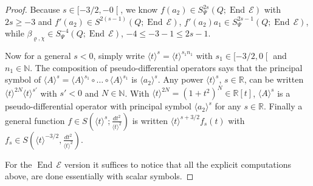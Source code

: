 \documentclass[AHL,Unicode,longabstracts]{cedram}
\newcommand{\R}{\mathbb{R}}
\newcommand{\N}{\mathbb{N}}
\newcommand{\clE}{\mathcal{E}}
\DeclareMathOperator{\End}{End}
\begin{document}
\begin{proof}
Because $s\in [-3/2,-0\mathclose{[}$, we know $f(a_{2})\in S^{2s}_{\Psi}(Q;\End\,\clE)$ with $2s\geq -3$ and $f'(a_{2})\in S^{2(s-1)}(Q;\End\,\clE)$, $f'(a_{2})a_{1}\in S^{2s-1}_{\Psi}(Q;\End\,\clE)$, while $\beta_{\varrho,\chi}\in S^{-4}_{\Psi}(Q;\End\,\clE)$, $-4\leq -3-1\leq 2s-1$.

Now for a general $s<0$, simply write $\langle t\rangle^{s}=\langle t\rangle^{s_{1}n_{1}}$ with $s_{1}\in [-3/2,0\mathclose{[}$ and $n_{1}\in \N$. The composition of pseudo-differential operators says that the principal symbol of $\langle A\rangle^{s}=\langle A\rangle^{s_{1}}\circ\dots\circ \langle A\rangle^{s_{1}}$ is $\langle a_{2}\rangle^{s}$. Any power $\langle t\rangle^{s}$, $s\in \R$, can be written $\langle t\rangle^{2N}\langle t\rangle^{s'}$ with $s'<0$ and $N\in \N$. With $\langle t\rangle^{2N}=(1+t^{2})^{N}\in \R[t]$, $\langle A\rangle^{s}$ is a pseudo-differential operator with principal symbol $\langle a_{2}\rangle^{s}$ for any $s\in \R$. Finally a general function $f\in S(\langle t\rangle^{s};\frac{dt^{2}}{\langle t\rangle^{2}})$ is written $\langle t\rangle^{s+3/2}f_{s}(t)$ with $f_{s}\in S(\langle t\rangle^{-3/2},\frac{dt^{2}}{\langle t\rangle^{2}})$.

For the $\End\,\clE$ version it suffices to notice that all the explicit computations above, are done essentially with scalar symbols.
\end{proof}

\let\OLDthebibliography\thebibliography
\renewcommand\thebibliography[1]{
\OLDthebibliography{#1}
\setlength{\parskip}{0pt}
\setlength{\itemsep}{7pt plus 0.3ex}}

\end{document}
